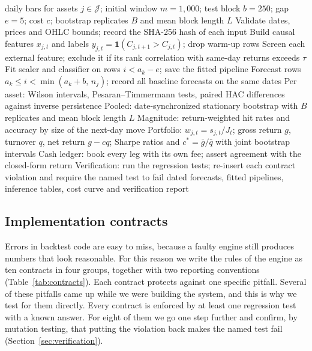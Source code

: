 \documentclass[preprint,12pt,authoryear,a4paper]{elsarticle}
\begin{document}
\begin{algorithm}[htbp]
\caption{Verified walk-forward evaluation}
\label{alg:framework}
\begin{algorithmic}[1]
\Require daily bars for assets $j\in\mathcal{J}$; initial window $m=1{,}000$; test
block $b=250$; gap $e=5$; cost $c$; bootstrap replicates $B$ and mean block length $L$
\State Validate dates, prices and OHLC bounds; record the SHA-256 hash of each input
\State Build causal features $x_{j,t}$ and labels $y_{j,t}=\mathbf{1}(C_{j,t+1}>C_{j,t})$; drop warm-up rows
\State Screen each external feature; exclude it if its rank correlation with same-day returns exceeds $\tau$
  \State Fit scaler and classifier on rows $i<a_k-e$; save the fitted pipeline
  \State Forecast rows $a_k\le i<\min(a_k+b,\,n_j)$; record all baseline forecasts on the same dates
\EndFor
\State Per asset: Wilson intervals, Pesaran--Timmermann tests, paired HAC differences against inverse persistence
\State Pooled: date-synchronized stationary bootstrap with $B$ replicates and mean block length $L$
\State Magnitude: return-weighted hit rates and accuracy by size of the next-day move
\State Portfolio: $w_{j,t}=s_{j,t}/J_t$; gross return $g$, turnover $q$, net return $g-cq$; Sharpe ratios and $c^{*}=\bar g/\bar q$ with joint bootstrap intervals
\State Cash ledger: book every leg with its own fee; assert agreement with the closed-form return
\State Verification: run the regression tests; re-insert each contract violation and require the named test to fail
\Ensure dated forecasts, fitted pipelines, inference tables, cost curve and verification report
\end{algorithmic}
\end{algorithm}

\subsection{Implementation contracts}\label{ssec:contracts}

Errors in backtest code are easy to miss, because a faulty engine still produces
numbers that look reasonable. For this reason we write the rules of the engine as
ten contracts in four groups, together with two reporting conventions
(Table~\ref{tab:contracts}). Each contract protects against one specific pitfall.
Several of these pitfalls came up while we were building the system, and this is
why we test for them directly. Every contract is enforced by at least one
regression test with a known answer. For eight of them we go one step further and
confirm, by mutation testing, that putting the violation back makes the named test
fail (Section~\ref{sec:verification}).
\end{document}

